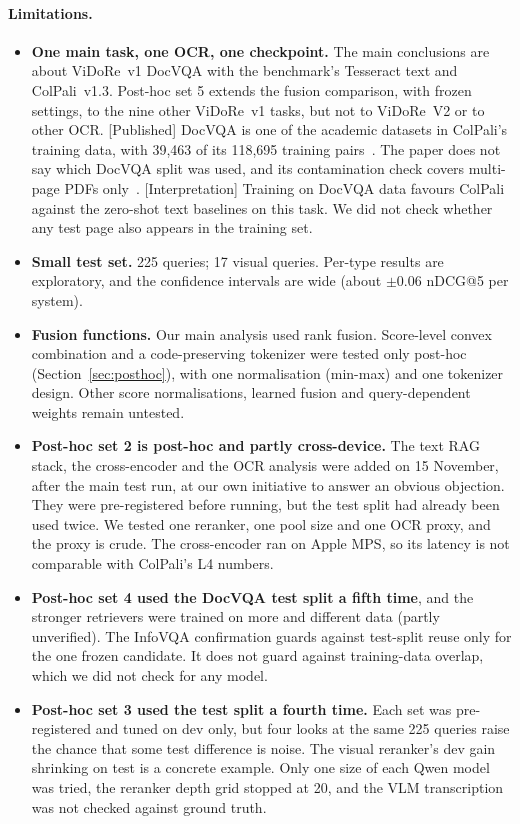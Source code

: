 \documentclass[11pt,a4paper]{article}
\newcommand{\lbl}[2]{\textsf{\scriptsize\textcolor{#1}{[#2]}}}
\newcommand{\Pub}{\lbl{tagP}{Published}}
\newcommand{\Int}{\lbl{tagI}{Interpretation}}
\begin{document}
\paragraph{Limitations.}
\begin{itemize}
  \item \textbf{One main task, one OCR, one checkpoint.} The main conclusions are about ViDoRe~v1 DocVQA with the benchmark's Tesseract text and ColPali~v1.3. Post-hoc set 5 extends the fusion comparison, with frozen settings, to the nine other ViDoRe~v1 tasks, but not to ViDoRe~V2 or to other OCR. \Pub{} DocVQA is one of the academic datasets in ColPali's training data, with 39,463 of its 118,695 training pairs~\cite[\S4.2, App.~A.3, Table~3]{colpali}. The paper does not say which DocVQA split was used, and its contamination check covers multi-page PDFs only~\cite[\S4.2]{colpali}. \Int{} Training on DocVQA data favours ColPali against the zero-shot text baselines on this task. We did not check whether any test page also appears in the training set.
  \item \textbf{Small test set.} 225 queries; 17 visual queries. Per-type results are exploratory, and the confidence intervals are wide (about $\pm$0.06 nDCG@5 per system).
  \item \textbf{Fusion functions.} Our main analysis used rank fusion. Score-level convex combination and a code-preserving tokenizer were tested only post-hoc (Section~\ref{sec:posthoc}), with one normalisation (min-max) and one tokenizer design. Other score normalisations, learned fusion and query-dependent weights remain untested.
  \item \textbf{Post-hoc set 2 is post-hoc and partly cross-device.} The text RAG stack, the cross-encoder and the OCR analysis were added on 15 November, after the main test run, at our own initiative to answer an obvious objection. They were pre-registered before running, but the test split had already been used twice. We tested one reranker, one pool size and one OCR proxy, and the proxy is crude. The cross-encoder ran on Apple MPS, so its latency is not comparable with ColPali's L4 numbers.
  \item \textbf{Post-hoc set 4 used the DocVQA test split a fifth time}, and the stronger retrievers were trained on more and different data (partly unverified). The InfoVQA confirmation guards against test-split reuse only for the one frozen candidate. It does not guard against training-data overlap, which we did not check for any model.
  \item \textbf{Post-hoc set 3 used the test split a fourth time.} Each set was pre-registered and tuned on dev only, but four looks at the same 225 queries raise the chance that some test difference is noise. The visual reranker's dev gain shrinking on test is a concrete example. Only one size of each Qwen model was tried, the reranker depth grid stopped at 20, and the VLM transcription was not checked against ground truth.

\end{itemize}
\end{document}
